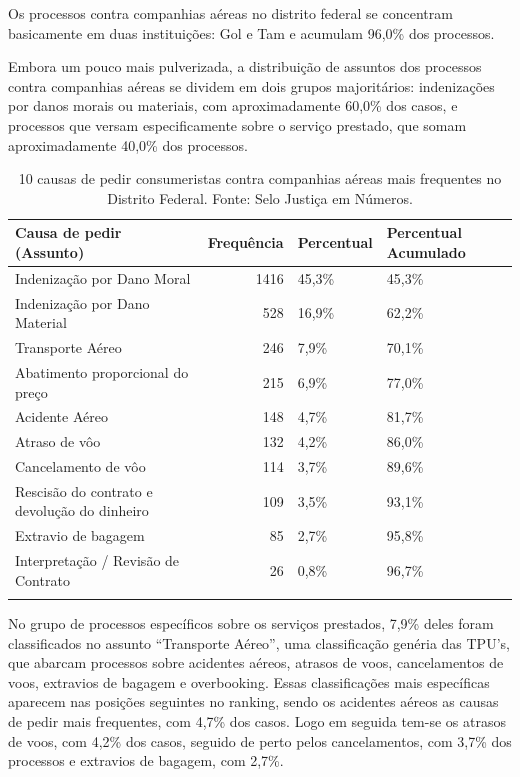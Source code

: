 \documentclass[]{report}
\begin{document}
Os processos contra companhias aéreas no distrito federal se concentram
basicamente em duas instituições: Gol e Tam e acumulam 96,0\% dos
processos.

Embora um pouco mais pulverizada, a distribuição de assuntos dos
processos contra companhias aéreas se dividem em dois grupos
majoritários: indenizações por danos morais ou materiais, com
aproximadamente 60,0\% dos casos, e processos que versam especificamente
sobre o serviço prestado, que somam aproximadamente 40,0\% dos
processos.

\begin{longtable}{lrll}
\caption{10 causas de pedir consumeristas contra companhias aéreas mais frequentes no Distrito Federal. Fonte: Selo Justiça em Números.} \\
  \hline
Causa de pedir (Assunto) & Frequência & Percentual & Percentual Acumulado \\
  \hline
Indenização por Dano Moral & 1416 & 45,3\% & 45,3\% \\
  Indenização por Dano Material & 528 & 16,9\% & 62,2\% \\
  Transporte Aéreo & 246 & 7,9\% & 70,1\% \\
  Abatimento proporcional do preço & 215 & 6,9\% & 77,0\% \\
  Acidente Aéreo & 148 & 4,7\% & 81,7\% \\
  Atraso de vôo & 132 & 4,2\% & 86,0\% \\
  Cancelamento de vôo & 114 & 3,7\% & 89,6\% \\
  Rescisão do contrato e devolução do dinheiro & 109 & 3,5\% & 93,1\% \\
  Extravio de bagagem &  85 & 2,7\% & 95,8\% \\
  Interpretação / Revisão de Contrato &  26 & 0,8\% & 96,7\% \\
   \hline
\hline
\label{unnamed-chunk-62}
\end{longtable}

No grupo de processos específicos sobre os serviços prestados, 7,9\%
deles foram classificados no assunto ``Transporte Aéreo'', uma
classificação genéria das TPU's, que abarcam processos sobre acidentes
aéreos, atrasos de voos, cancelamentos de voos, extravios de bagagem e
overbooking. Essas classificações mais específicas aparecem nas posições
seguintes no ranking, sendo os acidentes aéreos as causas de pedir mais
frequentes, com 4,7\% dos casos. Logo em seguida tem-se os atrasos de
voos, com 4,2\% dos casos, seguido de perto pelos cancelamentos, com
3,7\% dos processos e extravios de bagagem, com 2,7\%.
\end{document}
